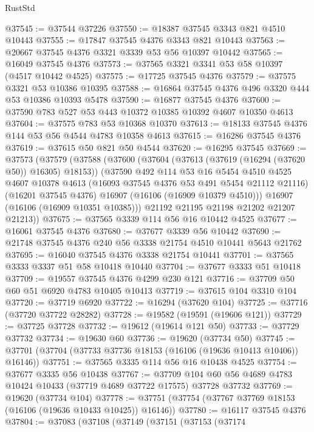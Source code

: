 \begin{lexlean}{RustStd}
\begin{coremodule}
@37545 := @37544 @37226
@37550 := @18387 @37545 @3343 @821 @4510 @10443
@37555 := @17847 @37545 @4376 @3343 @821 @10443
@37563 := @20667 @37545 @4376 @3321 @3339 @53 @56 @10397 @10442
@37565 := @16049 @37545 @4376
@37573 := @37565 @3321 @3341 @53 @58 @10397 (@4517 @10442 @4525)
@37575 := @17725 @37545 @4376
@37579 := @37575 @3321 @53 @10386 @10395
@37588 := @16864 @37545 @4376 @496 @3320 @444 @53 @10386 @10393 @5478
@37590 := @16877 @37545 @4376
@37600 := @37590 @783 @527 @53 @443 @10372 @10385 @10392 @4607 @10350 @4613
@37604 := @37575 @783 @53 @10368 @10370
@37613 := @18133 @37545 @4376 @144 @53 @56 @4544 @4783 @10358 @4613
@37615 := @16286 @37545 @4376
@37619 := @37615 @50 @821 @50 @4544
@37620 := @16295 @37545
@37669 := @37573
    (@37579
      (@37588
        (@37600
          (@37604 (@37613 (@37619 (@16294 (@37620 @50)) @16305) @18153))
          (@37590
            @492
            @114
            @53
            @16
            @5454
            @4510
            @4525
            @4607
            @10378
            @4613
            (@16093 @37545 @4376 @53 @491 @5454 @21112 @21116)
            (@16201 @37545 @4376)
            @16907
            (@16106 (@16909 @10379 @4510)))
          @16907
          (@16106 (@16909 @10351 @10385)))
        @21192
        @21195
        @21198
        @21202
        @21207
        @21213))
@37675 := @37565 @3339 @114 @56 @16 @10442 @4525
@37677 := @16061 @37545 @4376
@37680 := @37677 @3339 @56 @10442
@37690 := @21748 @37545 @4376 @240 @56 @3338 @21754 @4510 @10441 @5643 @21762
@37695 := @16040 @37545 @4376 @3338 @21754 @10441
@37701 := @37565 @3333 @3337 @51 @58 @10418 @10440
@37704 := @37677 @3333 @51 @10418
@37709 := @19557 @37545 @4376 @4299 @230 @121
@37716 := @37709 @50 @60 @51 @6920 @4783 @10405 @10413
@37719 := @37615 @104 @3310 @104
@37720 := @37719 @6920
@37722 := @16294 (@37620 @104)
@37725 := @37716 (@37720 @37722 @28282)
@37728 := @19582 (@19591 (@19606 @121))
@37729 := @37725 @37728
@37732 := @19612 (@19614 @121 @50)
@37733 := @37729 @37732
@37734 := @19630 @60
@37736 := @19620 (@37734 @50)
@37745 := @37701 (@37704 (@37733 @37736 @18153 (@16106 (@19636 @10413 @10406)) @16146))
@37751 := @37565 @3335 @114 @56 @16 @10438 @4525
@37754 := @37677 @3335 @56 @10438
@37767 := @37709 @104 @60 @56 @4689 @4783 @10424 @10433 (@37719 @4689 @37722 @17575) @37728 @37732
@37769 := @19620 (@37734 @104)
@37778 := @37751 (@37754 (@37767 @37769 @18153 (@16106 (@19636 @10433 @10425)) @16146))
@37780 := @16117 @37545 @4376
@37804 := @37083
    (@37108
      (@37149
        (@37151
          (@37153
            (@37174

\end{coremodule}
\end{lexlean}
